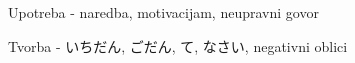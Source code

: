 
\author{Kristijan Čavić}


	\begin{hyou}
	\item Upotreba - naredba, motivacijam, neupravni govor
	\item Tvorba - いちだん, ごだん, て, なさい, negativni oblici
	\end{hyou}
